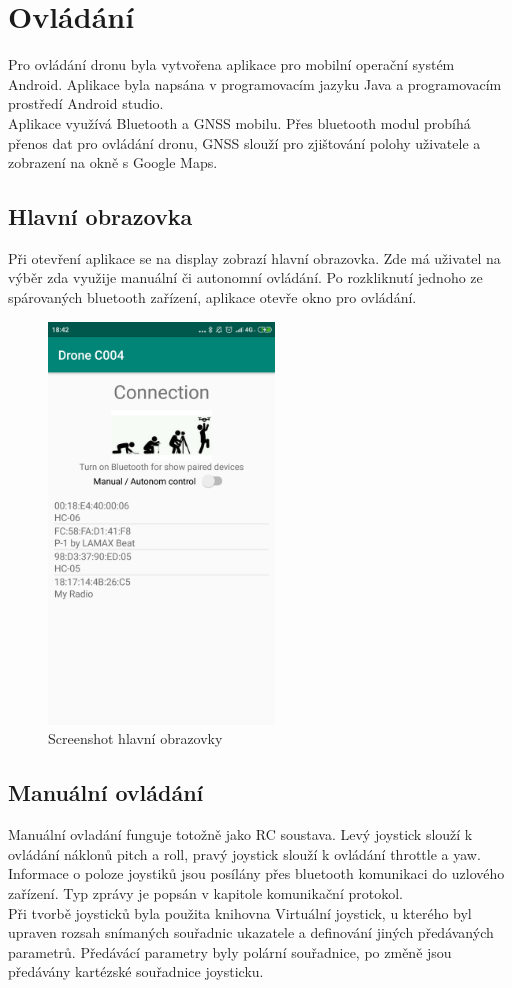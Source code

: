 \chapter{Ovládání}
\label{7-aplikace}
Pro ovládání dronu byla vytvořena aplikace pro mobilní operační systém Android. Aplikace byla napsána v programovacím jazyku Java a programovacím prostředí Android studio.\cite{android} \cite{codemitch}\\
Aplikace využívá Bluetooth a GNSS mobilu. Přes bluetooth modul probíhá přenos dat pro ovládání dronu, GNSS slouží pro zjištování polohy uživatele a zobrazení na okně s Google Maps.\\

\section{Hlavní obrazovka}
Při otevření aplikace se na display zobrazí hlavní obrazovka. Zde má uživatel na výběr zda využije manuální či autonomní ovládání. Po rozkliknutí jednoho ze spárovaných bluetooth zařízení, aplikace otevře okno pro ovládání.\\
\begin{figure}[H]
	\centering
	\includegraphics[width=6cm]{pictures/app1.png}
	\caption{Screenshot hlavní obrazovky}
\end{figure}

\section{Manuální ovládání} 
Manuální ovladání funguje totožně jako RC soustava. Levý joystick slouží k ovládání náklonů pitch a roll, pravý joystick slouží k ovládání throttle a yaw. Informace o poloze joystiků jsou posílány přes bluetooth komunikaci do uzlového zařízení. Typ zprávy je popsán v kapitole komunikační protokol.\\
Při tvorbě joysticků byla použita knihovna Virtuální joystick, u kterého byl upraven rozsah snímaných souřadnic ukazatele a definování jiných předávaných parametrů. Předávácí parametry byly polární souřadnice, po změně jsou předávány kartézské souřadnice joysticku. \cite{joystick}\\\\

